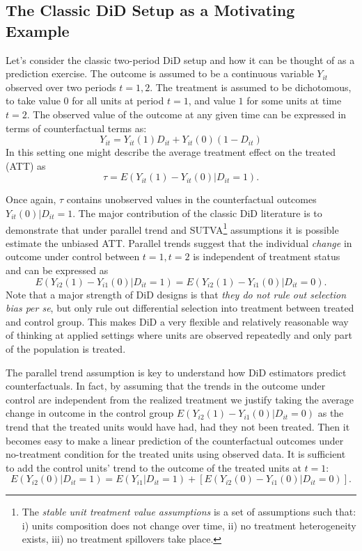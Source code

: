 \documentclass[hidelinks]{article}\usepackage[]{graphicx}\usepackage[]{xcolor}
\begin{document}
\subsection{The Classic DiD Setup as a Motivating Example}

Let's consider the classic two-period DiD setup and how it can be thought of as a prediction exercise. The outcome is assumed to be a continuous variable $Y_{it}$ observed over two periods $t=1, 2$. The treatment is assumed to be dichotomous, to take value $0$ for all units at period $t=1$, and value $1$ for some units at time $t=2$. The observed value of the outcome at any given time can be expressed in terms of counterfactual terms as:
$$ Y_{it} = Y_{it}(1)D_{it} + Y_{it}(0)(1 - D_{it}) $$
In this setting one might describe the average treatment effect on the treated (ATT) as
$$ \tau = E(Y_{it} (1) - Y_{it}(0) | D_{it} = 1). $$

Once again, $\tau$ contains unobserved values in the counterfactual outcomes $Y_{it}(0) | D_{it} = 1$. The major contribution of the classic DiD literature \parencite[e.g.,][]{Angrist2009} is to demonstrate that under parallel trend and SUTVA\footnote{The \textit{stable unit treatment value assumptions} is a set of assumptions such that: i) units composition does not change over time, ii) no treatment heterogeneity exists, iii) no treatment spillovers take place.} assumptions it is possible estimate the unbiased ATT. Parallel trends suggest that the individual \textit{change} in outcome under control between $t = 1, t= 2$ is independent of treatment status and can be expressed as
$$ E(Y_{i2} (1) - Y_{i1}(0) | D_{it} = 1) = E(Y_{i2} (1) - Y_{i1}(0) | D_{it} = 0). $$
Note that a major strength of DiD designs is that \textit{they do not rule out selection bias per se}, but only rule out differential selection into treatment between treated and control group. This makes DiD a very flexible and relatively reasonable way of thinking at applied settings where units are observed repeatedly and only part of the population is treated.

The parallel trend assumption is key to understand how DiD estimators predict counterfactuals. In fact, by assuming that the trends in the outcome under control are independent from the realized treatment we justify taking the average change in outcome in the control group $E(Y_{i2} (1) - Y_{i1}(0) | D_{it} = 0)$ as the trend that the treated units would have had, had they not been treated. Then it becomes easy to make a linear prediction of the counterfactual outcomes under no-treatment condition for the treated units using observed data. It is sufficient to add the control units' trend to the outcome of the treated units at $t=1$:
$$ E(Y_{i2}(0) | D_{it} = 1) = E(Y_{i1} | D_{it} = 1) + \left[ E(Y_{i2} (0) - Y_{i1}(0) | D_{it} = 0) \right] .$$
\end{document}
